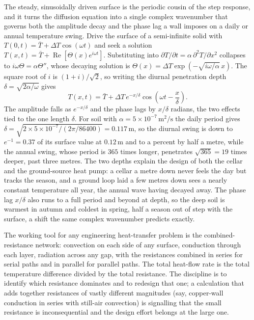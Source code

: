 \begin{mastery}
The steady, sinusoidally driven surface is the periodic cousin of the step
response, and it turns the diffusion equation into a single complex
wavenumber that governs both the amplitude decay and the phase lag a wall
imposes on a daily or annual temperature swing. Drive the surface of a
semi-infinite solid with $T(0,t) = \bar{T} + \Delta T\cos(\omega t)$ and
seek a solution $T(x,t) = \bar{T} + \operatorname{Re}[\Theta(x)e^{i\omega
t}]$. Substituting into $\partial T/\partial t = \alpha\,\partial^2 T/
\partial x^2$ collapses to $i\omega\Theta = \alpha\Theta''$, whose decaying
solution is $\Theta(x) = \Delta T\exp(-\sqrt{i\omega/\alpha}\,x)$. The
square root of $i$ is $(1+i)/\sqrt{2}$, so writing the diurnal penetration
depth $\delta = \sqrt{2\alpha/\omega}$ gives
\[
T(x,t) = \bar{T} + \Delta T\,e^{-x/\delta}\cos\!\left(\omega t -
\frac{x}{\delta}\right).
\]
The amplitude falls as $e^{-x/\delta}$ and the phase lags by $x/\delta$
radians, the two effects tied to the one length $\delta$. For soil with
$\alpha = 5\times10^{-7}\,\text{m}^2/\text{s}$ the daily period gives
$\delta = \sqrt{2\times5\times10^{-7}/(2\pi/86400)} = 0.117\,\text{m}$, so
the diurnal swing is down to $e^{-1} = 0.37$ of its surface value at
$0.12\,\text{m}$ and to a percent by half a metre, while the annual swing,
whose period is $365$ times longer, penetrates $\sqrt{365} = 19$ times
deeper, past three metres. The two depths explain the design of both the
cellar and the ground-source heat pump: a cellar a metre down never feels
the day but tracks the season, and a ground loop laid a few metres down
sees a nearly constant temperature all year, the annual wave having decayed
away. The phase lag $x/\delta$ also runs to a full period and beyond at
depth, so the deep soil is warmest in autumn and coldest in spring, half a
season out of step with the surface, a shift the same complex wavenumber
predicts exactly.
\end{mastery}

\begin{principle}
The working tool for any engineering heat-transfer problem is the
combined-resistance network: convection on each side of any surface,
conduction through each layer, radiation across any gap, with the
resistances combined in series for serial paths and in parallel for
parallel paths. The total heat-flow rate is the total temperature
difference divided by the total resistance. The discipline is to
identify which resistance dominates and to redesign that one; a
calculation that adds together resistances of vastly different
magnitudes (say, copper-wall conduction in series with still-air
convection) is signalling that the small resistance is
inconsequential and the design effort belongs at the large one.
\end{principle}

